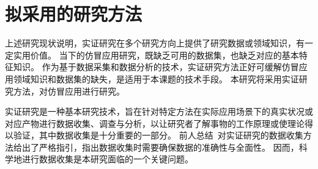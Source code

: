 \section{拟采用的研究方法}
上述研究现状说明，实证研究在多个研究方向上提供了研究数据或领域知识，有一定实用价值。
当下的仿冒应用研究，既缺乏可用的数据集，也缺乏对应的基本特征知识。
作为基于数据采集和数据分析的技术，实证研究方法正好可缓解仿冒应用领域知识和数据集的缺失，是适用于本课题的技术手段。
本研究将采用实证研究方法，对仿冒应用进行研究。

实证研究是一种基本研究技术，旨在针对特定方法在实际应用场景下的真实状况或对应产物进行数据收集、调查与分析，以让研究者了解事物的工作原理或使理论得以验证，其中数据收集是十分重要的一部分。
前人总结~\cite{kitchenham2002preliminary}对实证研究的数据收集方法给出了严格指引，指出数据收集时需要确保数据的准确性与全面性。
因而，科学地进行数据收集是本研究面临的一个关键问题。

